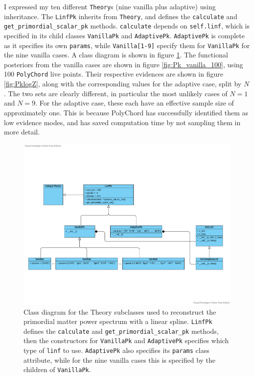 \documentclass{article}
\begin{document}
I expressed my ten different \texttt{Theory}s (nine vanilla plus adaptive) using inheritance. The \texttt{LinfPk} inherits from \texttt{Theory}, and defines the \texttt{calculate} and \texttt{get\_primordial\_scalar\_pk} methods. \texttt{calculate} depends on \texttt{self.linf}, which is specified in its child classes \texttt{VanillaPk} and \texttt{AdaptivePk}. \texttt{AdaptivePk} is complete as it specifies its own \texttt{params}, while \texttt{Vanilla[1-9]} specify them for  \texttt{VanillaPk} for the nine vanilla cases. A class diagram is shown in figure \ref{fig:PkUMLDiagram}. The functional posteriors from the vanilla cases are shown in figure \ref{fig:Pk_vanilla_100}, using 100 \texttt{PolyChord} live points. Their respective evidences are shown in figure \ref{fig:PklogZ}, along with the corresponding values for the adaptive case, split by $N$. The two sets are clearly different, in particular the most unlikely cases of $N=1$ and $N=9$. For the adaptive case, these each have an effective sample size of approximately one. This is because PolyChord has successfully identified them as low evidence modes, and has saved computation time by not sampling them in more detail.

\begin{figure}
  \centering
  \includegraphics[width=16cm]{Pk_linf.pdf}
  \caption{Class diagram for the Theory subclasses used to reconstruct the primordial matter power spectrum with a linear spline. \texttt{LinfPk} defines the \texttt{calculate} and \texttt{get\_primordial\_scalar\_pk} methods, then the constructors for \texttt{VanillaPk} and \texttt{AdaptivePk} specifies which type of \texttt{linf} to use. \texttt{AdaptivePk} also specifies its \texttt{params} class attribute, while for the nine vanilla cases this is specified by the children of \texttt{VanillaPk}.}
  \label{fig:PkUMLDiagram}
\end{figure}
\end{document}
